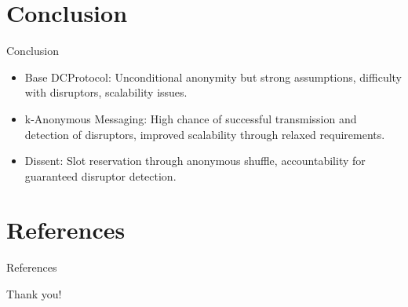 \documentclass[]{beamer} %
\begin{document}
\section{Conclusion}

\begin{frame}{Conclusion}

\begin{itemize}
\item Base \ac{DCProtocol}: Unconditional anonymity but strong assumptions,
      difficulty with disruptors, scalability issues.
\item k-Anonymous Messaging: High chance of successful transmission and
      detection of disruptors, improved scalability through relaxed requirements.
\item Dissent: Slot reservation through anonymous shuffle, accountability for
      guaranteed disruptor detection.
\end{itemize}

\end{frame}

\section{References}

\begin{frame}[allowframebreaks]{References}
\printbibliography
\end{frame}

\begin{titleframe}
\begin{center}
\alert{\Large Thank you!}
\end{center}
\end{titleframe}
\end{document}
